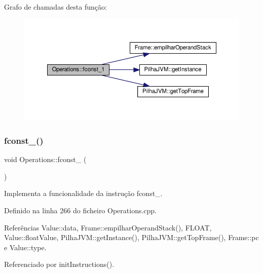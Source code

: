 Grafo de chamadas desta função\+:\nopagebreak
\begin{figure}[H]
\begin{center}
\leavevmode
\includegraphics[width=350pt]{classOperations_aa2053d7f3d410a4531f5bd560b4211b4_cgraph}
\end{center}
\end{figure}
\mbox{\label{classOperations_a1857c1a0e34d6f91dcb7166ca6d678a2}} 
\subsubsection{\texorpdfstring{fconst\+\_()}{fconst\_2()}}
{\footnotesize\ttfamily void Operations\+::fconst\+\_ (\begin{DoxyParamCaption}{ }\end{DoxyParamCaption})\hspace{0.3cm}{\ttfamily [private]}}



Implementa a funcionalidade da instrução fconst\+\_. 



Definido na linha 266 do ficheiro Operations.\+cpp.



Referências Value\+::data, Frame\+::empilhar\+Operand\+Stack(), F\+L\+O\+AT, Value\+::float\+Value, Pilha\+J\+V\+M\+::get\+Instance(), Pilha\+J\+V\+M\+::get\+Top\+Frame(), Frame\+::pc e Value\+::type.



Referenciado por init\+Instructions().

